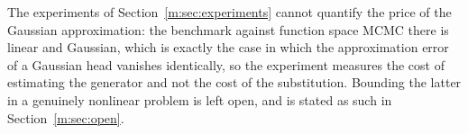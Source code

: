 The experiments of Section~\ref{m:sec:experiments} cannot quantify the price of the Gaussian approximation: the benchmark against function space MCMC there is linear and Gaussian, which is exactly the case in which the approximation error of a Gaussian head vanishes identically, so the experiment measures the cost of estimating the generator and not the cost of the substitution. Bounding the latter in a genuinely nonlinear problem is left open, and is stated as such in Section~\ref{m:sec:open}.
